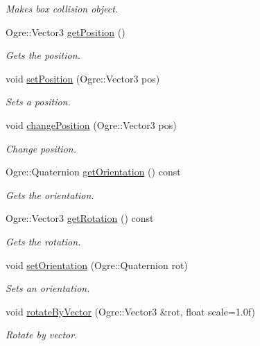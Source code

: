 \begin{DoxyCompactItemize}
\begin{DoxyCompactList}\small\item\em Makes box collision object. \end{DoxyCompactList}\item 
Ogre\-::\-Vector3 \hyperlink{class_objects_1_1_i_object_ae395cf4191bf916973860106b0816c66}{get\-Position} ()
\begin{DoxyCompactList}\small\item\em Gets the position. \end{DoxyCompactList}\item 
void \hyperlink{class_objects_1_1_i_object_a37e429804be393d3b677f2cff2540073}{set\-Position} (Ogre\-::\-Vector3 pos)
\begin{DoxyCompactList}\small\item\em Sets a position. \end{DoxyCompactList}\item 
void \hyperlink{class_objects_1_1_i_object_abf79e6a85faa05adbba1f1cbc83c3564}{change\-Position} (Ogre\-::\-Vector3 pos)
\begin{DoxyCompactList}\small\item\em Change position. \end{DoxyCompactList}\item 
Ogre\-::\-Quaternion \hyperlink{class_objects_1_1_i_object_aff14fa622a7155a324dca06b5fb9b22f}{get\-Orientation} () const 
\begin{DoxyCompactList}\small\item\em Gets the orientation. \end{DoxyCompactList}\item 
Ogre\-::\-Vector3 \hyperlink{class_objects_1_1_i_object_a0cf4689f31dc6d9bd02b0b94537c8086}{get\-Rotation} () const 
\begin{DoxyCompactList}\small\item\em Gets the rotation. \end{DoxyCompactList}\item 
void \hyperlink{class_objects_1_1_i_object_a310aa6d7062af232279b4594c10e415b}{set\-Orientation} (Ogre\-::\-Quaternion rot)
\begin{DoxyCompactList}\small\item\em Sets an orientation. \end{DoxyCompactList}\item 
void \hyperlink{class_objects_1_1_i_object_a20c88273ac16887e388b8b1c3a872d48}{rotate\-By\-Vector} (Ogre\-::\-Vector3 \&rot, float scale=1.\-0f)
\begin{DoxyCompactList}\small\item\em Rotate by vector. \end{DoxyCompactList}\item 

\end{DoxyCompactItemize}
